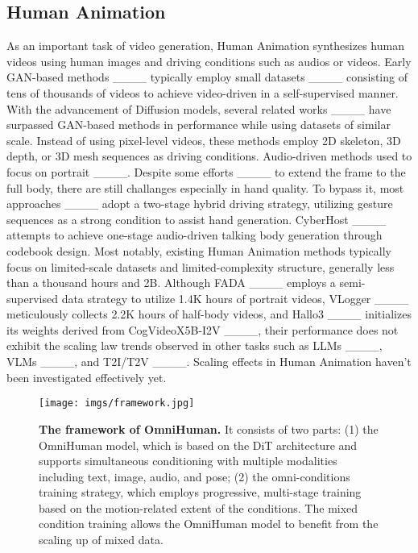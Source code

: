   \subsection{Human Animation}
  As an important task of video generation, Human Animation synthesizes human videos using human images and driving conditions such as audios or videos. Early  GAN-based methods ____ typically employ small datasets ____ consisting of tens of thousands of videos to achieve video-driven in a self-supervised manner. With the advancement of Diffusion models, several related works ____ have surpassed GAN-based methods in performance while using datasets of similar scale. Instead of using pixel-level videos, these methods employ 2D skeleton, 3D depth, or 3D mesh sequences as driving conditions.
  Audio-driven methods used to focus on portrait ____. Despite some efforts ____ to extend the frame to the full body, there are still challanges especially in hand quality. To bypass it, most approaches ____ adopt a two-stage hybrid driving strategy, utilizing gesture sequences as a strong condition to assist hand generation. CyberHost ____ attempts to achieve one-stage audio-driven talking body generation through codebook design.
  Most notably, existing Human Animation methods typically focus on limited-scale datasets and limited-complexity structure, generally less than a thousand hours and 2B. Although FADA ____ employs a semi-supervised data strategy to utilize 1.4K hours of portrait videos, VLogger ____ meticulously collects 2.2K hours of half-body videos, and Hallo3 ____ initializes its weights derived from CogVideoX5B-I2V ____, their performance  does not exhibit the scaling law trends observed in other tasks such as LLMs ____, VLMs ____, and T2I/T2V ____. Scaling effects in Human Animation  haven't been investigated effectively yet.

  

\begin{figure*}[t]
    \centering
    \texttt{[image: imgs/framework.jpg]}
    \caption{\small \textbf{The framework of OmniHuman.} It consists of two parts: (1) the OmniHuman model, which is based on the DiT architecture and supports simultaneous conditioning with multiple modalities including text, image, audio, and pose; (2) the omni-conditions training strategy, which employs progressive, multi-stage training based on the motion-related extent of the conditions. The mixed condition training allows the OmniHuman model to benefit from the scaling up of mixed data.}
    \label{fig:framework}
\end{figure*}
